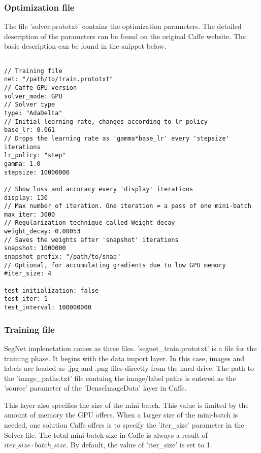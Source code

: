 \subsubsection{Optimization file}

The file 'solver.prototxt' contains the optimization parameters. The detailed description of the parameters can be found on the original Caffe website. The basic description can be found in the snippet below. 

\begin{lstlisting}

// Training file
net: "/path/to/train.prototxt"	
// Caffe GPU version
solver_mode: GPU
// Solver type		
type: "AdaDelta"
// Initial learning rate, changes according to lr_policy		
base_lr: 0.061		
// Drops the learning rate as 'gamma*base_lr' every 'stepsize' iterations
lr_policy: "step"		 	
gamma: 1.0
stepsize: 10000000

// Show loss and accuracy every 'display' iterations
display: 130
// Max number of iteration. One iteration = a pass of one mini-batch			
max_iter: 3000	
// Regularization technique called Weight decay		
weight_decay: 0.00053	
// Saves the weights after 'snapshot' iterations
snapshot: 1000000		
snapshot_prefix: "/path/to/snap" 
// Optional, for accumulating gradients due to low GPU memory 
#iter_size: 4			

test_initialization: false	
test_iter: 1
test_interval: 100000000

\end{lstlisting}

\subsubsection{Training file}

SegNet implenetation comes as three files. 'segnet\_train.prototxt' is a file for the training phase. It begins with the data import layer. In this case, images and labels are loaded as .jpg and .png files directly from the hard drive. The path to the 'image\_paths.txt' file containg the image/label paths is entered as the 'source' parameter of the 'DenseImageData' layer in Caffe.

This layer also specifies the size of the mini-batch. This value is limited by the amount of memory the GPU offers. When a larger size of the mini-batch is needed, one solution Caffe offers is to specify the 'iter\_size' parameter in the Solver file. The total mini-batch size in Caffe is always a result of $iter\_size \cdot batch\_size$. By default, the value of 'iter\_size' is set to 1.

